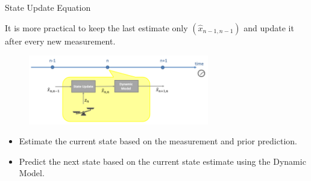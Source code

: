 \begin{frame}{State Update Equation}

It is more practical to keep the last estimate only $(\hat{x}_{n-1,n-1})$ and update it after every new measurement.
        \begin{figure}
		    \centering
		    \includegraphics[width=0.7\textwidth]{Figures/Chapter1/ex1_stateupdateequation.png}
		    \label{fig:ex1_stateUpdate}
	    \end{figure}

    \begin{itemize}
        \item Estimate the current state based on the measurement and prior prediction.
        \item Predict the next state based on the current state estimate using the Dynamic Model.
    \end{itemize} 

\end{frame}


